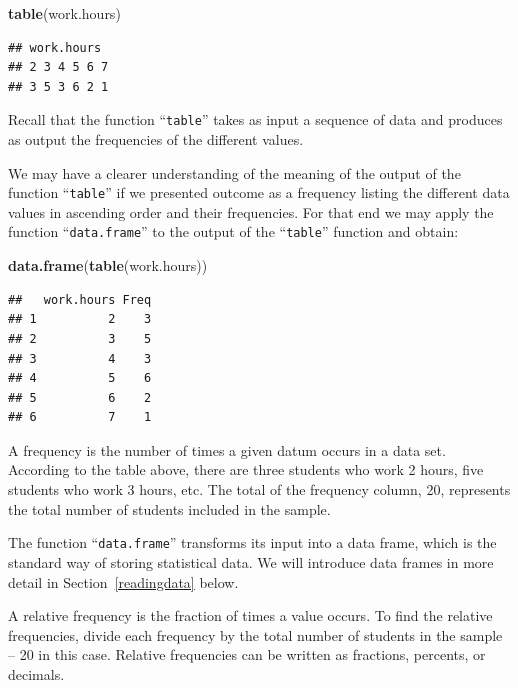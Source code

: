 \documentclass[]{krantz}
\makeatletter
\newenvironment{Shaded}{\begin{snugshade}}{\end{snugshade}}
\newcommand{\KeywordTok}[1]{\textcolor[rgb]{0.13,0.29,0.53}{\textbf{#1}}}
\newcommand{\NormalTok}[1]{#1}
\newenvironment{kframe}{%
\medskip{}
\setlength{\fboxsep}{.8em}
 \def\at@end@of@kframe{}%
 \ifinner\ifhmode%
  \def\at@end@of@kframe{\end{minipage}}%
  \begin{minipage}{\columnwidth}%
 \fi\fi%
 \def\FrameCommand##1{\hskip\@totalleftmargin \hskip-\fboxsep
 \colorbox{shadecolor}{##1}\hskip-\fboxsep
     \hskip-\linewidth \hskip-\@totalleftmargin \hskip\columnwidth}%
 \MakeFramed {\advance\hsize-\width
   \@totalleftmargin\z@ \linewidth\hsize
   \@setminipage}}%
 {\par\unskip\endMakeFramed%
 \at@end@of@kframe}
\renewenvironment{Shaded}{\begin{kframe}}{\end{kframe}}
\theoremstyle{definition}
\theoremstyle{definition}
\theoremstyle{definition}
\theoremstyle{remark}
\makeatother
\begin{document}
\begin{Shaded}
\begin{Highlighting}[]
\KeywordTok{table}\NormalTok{(work.hours)}
\end{Highlighting}
\end{Shaded}

\begin{verbatim}
## work.hours
## 2 3 4 5 6 7 
## 3 5 3 6 2 1
\end{verbatim}

Recall that the function ``\texttt{table}'' takes as input a sequence of
data and produces as output the frequencies of the different values.

We may have a clearer understanding of the meaning of the output of the
function ``\texttt{table}'' if we presented outcome as a frequency
listing the different data values in ascending order and their
frequencies. For that end we may apply the function
``\texttt{data.frame}'' to the output of the ``\texttt{table}'' function
and obtain:

\begin{Shaded}
\begin{Highlighting}[]
\KeywordTok{data.frame}\NormalTok{(}\KeywordTok{table}\NormalTok{(work.hours))}
\end{Highlighting}
\end{Shaded}

\begin{verbatim}
##   work.hours Freq
## 1          2    3
## 2          3    5
## 3          4    3
## 4          5    6
## 5          6    2
## 6          7    1
\end{verbatim}

A frequency is the number of times a given datum occurs in a data set.
According to the table above, there are three students who work 2 hours,
five students who work 3 hours, etc. The total of the frequency column,
20, represents the total number of students included in the sample.

The function ``\texttt{data.frame}'' transforms its input into a data
frame, which is the standard way of storing statistical data. We will
introduce data frames in more detail in Section~\ref{readingdata} below.

A relative frequency is the fraction of times a value occurs. To find
the relative frequencies, divide each frequency by the total number of
students in the sample -- 20 in this case. Relative frequencies can be
written as fractions, percents, or decimals.
\end{document}
